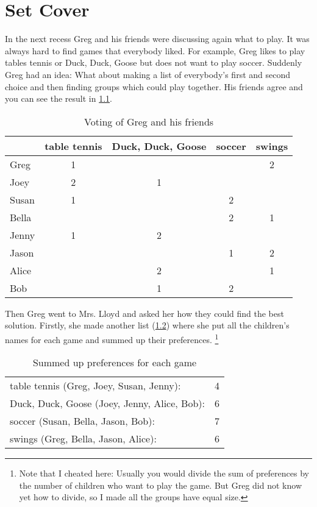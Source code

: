 \chapter{Set Cover}
In the next recess Greg and his friends were discussing again what
to play. It was always hard to find games that everybody liked.
For example, Greg likes to play tables tennis or Duck, Duck, Goose but
does not want to play soccer. Suddenly Greg had an idea: What about
making a list of everybody's first and second choice and then 
finding groups which could play together. His friends agree and
you can see the result in \cref{tab:game_voting}.

\begin{table}[ht]
  \centering
  \begin{tabular}{l|cccc}
    & table tennis & Duck, Duck, Goose & soccer & swings \\
    \hline
    Greg  & 1 &   &   & 2 \\
    Joey  & 2 & 1 &   &   \\
    Susan & 1 &   & 2 &   \\
    Bella &   &   & 2 & 1 \\
    Jenny & 1 & 2 &   &   \\
    Jason &   &   & 1 & 2 \\
    Alice &   & 2 &   & 1 \\
    Bob   &   & 1 & 2 &   \\
  \end{tabular}
  \caption{\label{tab:game_voting}Voting of Greg and his friends}
\end{table}

Then Greg went to Mrs. Lloyd and asked her how they could find the 
best solution. Firstly, she made another list
(\cref{tab:example_set_cover}) where she put all the children's
names for each game and summed up their preferences.%
\footnote{Note that I cheated here: Usually you would divide the
sum of preferences by the number of children who want to play the
game. But Greg did not know yet how to divide, so I made all the
groups have equal size.}

\begin{table}[ht]
  \centering
  \begin{tabular}{lc}
    table tennis (Greg, Joey, Susan, Jenny): & 4 \\
    Duck, Duck, Goose (Joey, Jenny, Alice, Bob): & 6 \\
    soccer (Susan, Bella, Jason, Bob):       & 7 \\
    swings (Greg, Bella, Jason, Alice):      & 6 \\
  \end{tabular}
  \caption{\label{tab:example_set_cover}Summed up preferences for each game}
\end{table}

